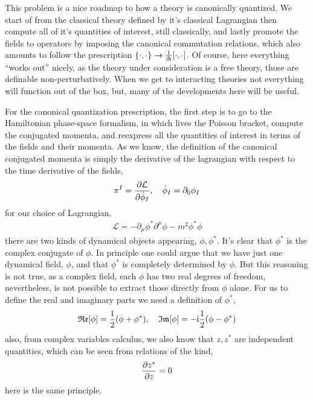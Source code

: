 \problem{}

This problem is a nice roadmap to how a theory is canonically quantized. 
We start of from the classical theory defined by it's classical Lagrangian 
then compute all of it's quantities of interest, still classically, and 
lastly promote the fields to operators by imposing the canonical commutation 
relations, which also amounts to follow the prescription $\acomm{\cdot}{\cdot}\rightarrow \frac{1}{\im\hbar}\comm{\cdot}{\cdot}$. 
Of course, here everything ``works out'' nicely, as the theory under consideration 
is a free theory, those are definable non-perturbatively. When we get to 
interacting theories not everything will function out of the box, but, 
many of the developments here will be useful.

\probitem{}

For the canonical quantization prescription, the first step is to go to 
the Hamiltonian phase-space formalism, in which lives the Poisson bracket, 
compute the conjugated momenta, and reexpress all the quantities of interest 
in terms of the fields and their momenta. As we know, the definition of the 
canonical conjugated momenta is simply the derivative of the lagrangian with 
respect to the time derivative of the fields,
\begin{align}
    \pi^I  = \pdv{\mathcal L}{\dot \phi_I},\ \ \ \dot\phi_ I = \partial_0\phi_ I
\end{align}
for our choice of Lagrangian,
\begin{align}
    \mathcal L = -\partial_\mu\phi^\ast\partial^\mu\phi-m^2\phi^\ast\phi
\end{align}
there are two kinds of dynamical objects appearing, $\phi,\phi^\ast$. It's clear that 
$\phi^\ast$ is the complex conjugate of $\phi$. In principle one could argue that we have just 
one dynamical field, $\phi$, and that $\phi^\ast$ is completely determined by $\phi$. 
But this reasoning is not true, as a complex field,  
each $\phi$ has two real degrees of freedom, nevertheless, is not possible to 
extract those directly from $\phi$ alone. For us to define the real and 
imaginary parts we need a definition of $\phi^\ast$,
\begin{align}
    \mathfrak{Re}\qty[\phi]=\frac12\qty(\phi+\phi^\ast),\ \ \ \mathfrak{Im}\qty[\phi] = -\im\frac12\qty(\phi-\phi^\ast)
\end{align}
also, from complex variables calculus, we also know that $z,z^\ast$ are 
independent quantities, which can be seen from relations of the kind,
\begin{align}
    \pdv{ z^\ast}{z} = 0
\end{align}
here is the same principle.

